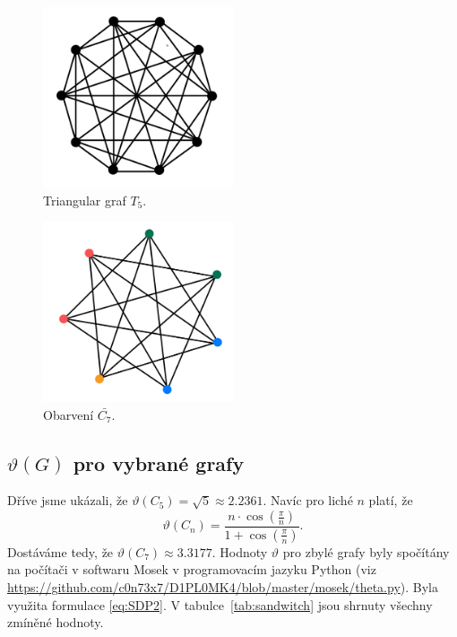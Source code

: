\begin{figure}[h!]
    \centering
    \includegraphics[width=0.5\textwidth]{img/complement_petersen.jpeg}   
    \caption{Triangular graf $T_5$.}
    \label{fig:complement_petersen}
\end{figure}

\begin{figure}[h!]
    \centering
    \includegraphics[width=0.5\textwidth]{img/complement_c7.jpeg}   
    \caption{Obarvení $\bar{C_7}$.}
    \label{fig:complement_c7}
\end{figure}

\subsection*{$\vartheta(G)$ pro vybrané grafy}

Dříve jsme ukázali, že $\vartheta(C_5) = \sqrt{5} \approx 2.2361$. Navíc pro liché $n$ platí, že
$$
    \vartheta(C_n) = \frac{n \cdot \cos(\frac{\pi}{n})}{1 + \cos(\frac{\pi}{n})}.
$$
Dostáváme tedy, že $\vartheta({C_7}) \approx 3.3177$. Hodnoty $\vartheta$ pro zbylé grafy byly spočítány na počítači v softwaru Mosek v programovacím jazyku Python (viz \url{https://github.com/c0n73x7/D1PL0MK4/blob/master/mosek/theta.py}). Byla využita formulace \ref{eq:SDP2}. V tabulce~\ref{tab:sandwitch} jsou shrnuty všechny zmíněné hodnoty.

